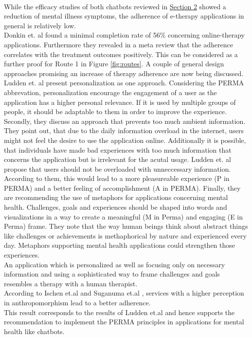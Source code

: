 \documentclass[sigconf, nonacm]{acmart}
\begin{document}
\\
While the efficacy studies of both chatbots reviewed in \hyperref[sec:two]{Section 2} showed a reduction of mental illness symptoms, the adherence of e-therapy applications in general is relatively low.
\\
Donkin et. al \cite{Donkin} found a minimal completion rate of 56\% concerning online-therapy applications. Furthermore they revealed in a meta review that the adherence correlates with the treatment outcomes positively\cite{Donkin2011}.
This can be considered as a further proof for Route 1 in Figure \ref{fig:routes}.  
A couple of general design approaches promising an increase of therapy adherence are now being discussed.
\\
Ludden et. al \cite{Ludden2015} present personalization as one approach. Considering the PERMA abbrevation, personalization encourage the engagement of a user as the application has a higher personal relevance. If it is used by multiple groups of people, it should be adaptable to them in order to improve the experience.
Secondly, they discuss an approach that prevents too much ambient information. They point out, that due to the daily information overload in the internet, users might not feel the desire to use the
application online. Additionally it is possible, that individuals have made bad experiences with too much information that concerns the application but is irrelevant for the acutal usage. 
Ludden et. al propose that users should not be overloaded with unneccessary information. According to them, this would lead to a more pleasureable experience (P in PERMA) and a better feeling of accomplishment (A in PERMA).
Finally, they are recommending the use of metaphors for applications concerning mental health. Challenges, goals and experiences should be shaped into words and visualizations in a way to create a meaningful (M in Perma) and engaging (E in Perma) frame.
They note that the way human beings think about abstract things like challenges or achievements is methaphorical by nature and experienced every day. Metaphors supporting mental health applications could strengthen those experiences.
\\
An application which is personalized as well as focusing only on necessary information and using a sophisticated way to frame challenges and goals resembles a therapy with a human therapist.
\\
According to Ischen et.al \cite{Ischen} and Suganuma et.al \cite{Suganuma2018}, services with a higher perception in anthropomorphism lead to a better adherence.
\\
This result corresponds to the results of Ludden et.al \cite{Ludden2015} and hence supports the recommendation to implement the PERMA principles in applications for mental health like chatbots. 
\\
\end{document}
